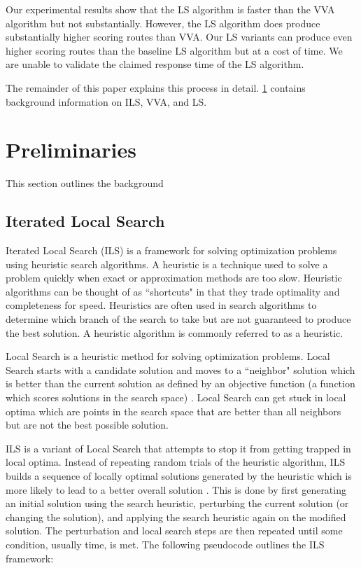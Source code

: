 \documentclass[honors]{union-cs-thesis}
\newcommand{\td}{\todo[inline]}
\begin{document}
Our experimental results show that the LS algorithm is faster than the VVA algorithm but not substantially. However, the LS algorithm does produce substantially higher scoring routes than VVA. Our LS variants can produce even higher scoring routes than the baseline LS algorithm but at a cost of time. We are unable to validate the claimed response time of the LS algorithm.

The remainder of this paper explains this process in detail. \cref{sec:prelim} contains background information on ILS, VVA, and LS.

\td{Edit this as I make new sections??}



\section{Preliminaries}
\label{sec:prelim}
This section outlines the background 


\subsection{Iterated Local Search}
Iterated Local Search (ILS) is a framework for solving optimization problems using heuristic search algorithms. A heuristic is a technique used to solve a problem quickly when exact or approximation methods are too slow. Heuristic algorithms can be thought of as ``shortcuts" in that they trade optimality and completeness for speed. Heuristics are often used in search algorithms to  determine which branch of the search to take but are not guaranteed to produce the best solution. A heuristic algorithm is commonly referred to as a heuristic.

Local Search is a heuristic method for solving optimization problems. Local Search starts with a candidate solution and moves to a ``neighbor" solution which is better than the current solution as defined by an objective function (a function which scores solutions in the search space) \cite{gendreau2010handbook}. Local Search can get stuck in local optima which are points in the search space that are better than all neighbors but are not the best possible solution.

ILS is a variant of Local Search that attempts to stop it from getting trapped in local optima. Instead of repeating random trials of the heuristic algorithm, ILS builds a sequence of locally optimal solutions generated by the heuristic which is more likely to lead to a better overall solution \cite{gendreau2010handbook}. This is done by first generating an initial solution using the search heuristic, perturbing the current solution (or changing the solution), and applying the search heuristic again on the modified solution. The perturbation and local search steps are then repeated until some condition, usually time, is met.
The following pseudocode outlines the ILS framework:
\end{document}
